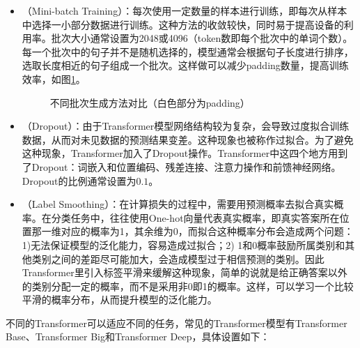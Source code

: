 \begin{itemize}
\vspace{0.5em}
\item {\small{}}（Mini-batch Training）：每次使用一定数量的样本进行训练，即每次从样本中选择一小部分数据进行训练。这种方法的收敛较快，同时易于提高设备的利用率。批次大小通常设置为2048或4096（token数即每个批次中的单词个数）。每一个批次中的句子并不是随机选择的，模型通常会根据句子长度进行排序，选取长度相近的句子组成一个批次。这样做可以减少padding数量，提高训练效率，如图\ref{fig:12-18}。

\begin{figure}[htp]
\centering

\caption{不同批次生成方法对比（白色部分为padding）}
\label{fig:12-18}
\end{figure}
\vspace{0.5em}
\item {\small{}}（Dropout）：由于Transformer模型网络结构较为复杂，会导致过度拟合训练数据，从而对未见数据的预测结果变差。这种现象也被称作过拟合。为了避免这种现象，Transformer加入了Dropout操作。Transformer中这四个地方用到了Dropout：词嵌入和位置编码、残差连接、注意力操作和前馈神经网络。Dropout的比例通常设置为$0.1$。
\vspace{0.5em}
\item {\small{}}（Label Smoothing）：在计算损失的过程中，需要用预测概率去拟合真实概率。在分类任务中，往往使用One-hot向量代表真实概率，即真实答案所在位置那一维对应的概率为1，其余维为0，而拟合这种概率分布会造成两个问题：1)无法保证模型的泛化能力，容易造成过拟合；2) 1和0概率鼓励所属类别和其他类别之间的差距尽可能加大，会造成模型过于相信预测的类别。因此Transformer里引入标签平滑来缓解这种现象，简单的说就是给正确答案以外的类别分配一定的概率，而不是采用非0即1的概率。这样，可以学习一个比较平滑的概率分布，从而提升模型的泛化能力。
\vspace{0.5em}
\end{itemize}

\parinterval 不同的Transformer可以适应不同的任务，常见的Transformer模型有Transformer Base、Transformer Big和Transformer Deep，具体设置如下：

